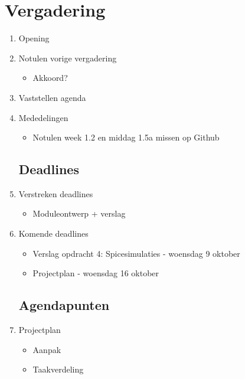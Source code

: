\documentclass{article}
\begin{document}
\section*{Vergadering}
\begin{enumerate}
	
	\subsection*{Vooraf}
	\item Opening
	\item Notulen vorige vergadering
	\begin{itemize}
		\item Akkoord?
	\end{itemize}
	\item Vaststellen agenda
	\item Mededelingen
	\begin{itemize}
		\item Notulen week 1.2 en middag 1.5a missen op Github
	\end{itemize}

	\subsection*{Deadlines}
	\item Verstreken deadlines
	\begin{itemize}
		\item Moduleontwerp + verslag
	\end{itemize}	
	\item Komende deadlines
	\begin{itemize}
		\item Verslag opdracht 4: Spicesimulaties - woensdag 9 oktober
		\item Projectplan - woensdag 16 oktober
	\end{itemize}

	\subsection*{Agendapunten}
	\item Projectplan
	\begin{itemize}
		\item Aanpak
		\item Taakverdeling
	\end{itemize}


\end{enumerate}
\end{document}
